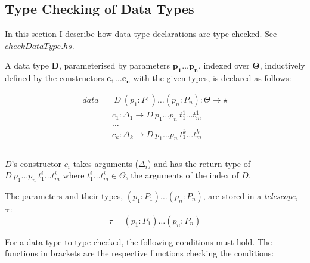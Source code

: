 \documentclass[acmsmall]{acmart}
\begin{document}
\subsection{Type Checking of Data Types}

In this section I describe how data type declarations are type checked. See \emph{$checkDataType.hs$}.

A data type $\boldsymbol{D}$, parameterised by parameters $\boldsymbol{p_1 \dots p_n}$, indexed over $\boldsymbol{\Theta}$, inductively defined by the constructors $\boldsymbol{c_1 \dots c_n}$ with the given types, is declared as follows:

\begin{equation*}
  \begin{aligned}
    data &  & \: D \: (p_1:P_1) \dots (p_n:P_n) : \Theta \to \star       \\
         &  & c_1 : \Delta_1 \to D \: p_1 \dots p_n \: t_1^1 \dots t_m^1 \\
         &  & \dots                                                      \\
         &  & c_k : \Delta_k \to D \: p_1 \dots p_n \: t_1^k \dots t_m^k \\                                                           \\
  \end{aligned}
\end{equation*}

$D$'s constructor $c_i$ takes arguments ($\Delta_i$) and has the return type of $D \: p_1 \dots p_n \: t_1^i \dots t_m^i$ where $t_1^i \dots t_m^i \in \Theta$, the arguments of the index of $D$.

The parameters and their types, $(p_1:P_1) \dots (p_n:P_n)$, are stored in a \emph{telescope}, $\boldsymbol{\tau}$:
\begin{equation*}
  \tau = (p_1:P_1) \dots (p_n:P_n)  
\end{equation*}

For a data type to type-checked, the following conditions must hold. The functions in brackets are the respective functions checking the conditions:
\end{document}
